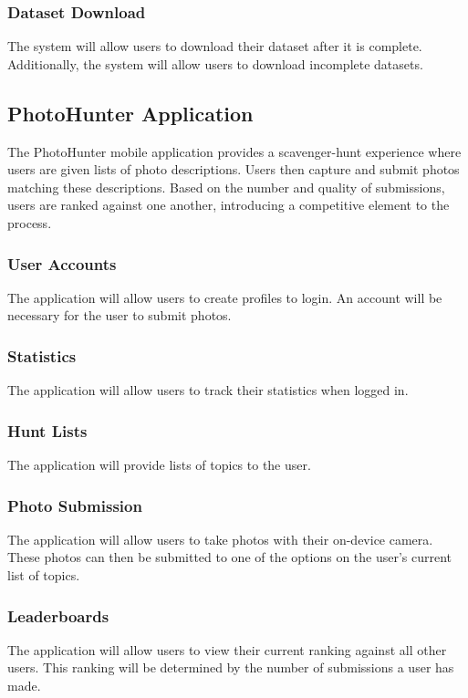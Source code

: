 \documentclass{article}
\begin{document}
	\subsubsection{Dataset Download}
  The system will allow users to download their dataset after it is complete.
  Additionally, the system will allow users to download incomplete datasets. 
	
	
\subsection{PhotoHunter Application}
The PhotoHunter mobile application provides a scavenger-hunt experience where
users are given lists of photo descriptions. Users then capture and submit
photos matching these descriptions. Based on the number and quality of
submissions, users are ranked against one another, introducing a competitive
element to the process.

	\subsubsection{User Accounts}
  The application will allow users to create profiles to login. An account will
  be necessary for the user to submit photos.
	
	\subsubsection{Statistics}
	The application will allow users to track their statistics when logged in.
	
	\subsubsection{Hunt Lists}
	The application will provide lists of topics to the user.
	
	\subsubsection{Photo Submission}
  The application will allow users to take photos with their on-device camera.
  These photos can then be submitted to one of the options on the user's current
  list of topics.
	
	\subsubsection{Leaderboards}
  The application will allow users to view their current ranking against all
  other users. This ranking will be determined by the number of submissions a
  user has made.
	
\end{document}
